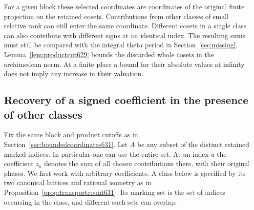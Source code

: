\documentclass[a4paper,11pt]{article}
\theoremstyle{definition}
\theoremstyle{remark}
\numberwithin{equation}{section}
\begin{document}
For a given block these selected coordinates are coordinates of the
original finite projection on the retained cosets. Contributions from
other classes of small relative rank can still enter the same
coordinate. Different cosets in a single class can also contribute
with different signs at an identical index. The resulting sums must
still be compared with the integral theta period in
Section~\ref{sec:missing}. Lemma~\ref{lem:productcut629} bounds the
discarded whole cosets in the archimedean norm. At a finite place a
bound for their absolute values at infinity does not imply any
increase in their valuation.


\subsection{Recovery of a signed coefficient in the presence of other classes}
\label{sec:localrecovery632}

Fix the same block and product cutoffs as in
Section~\ref{sec:boundedcoordinates631}. Let \(A\) be any subset of
the distinct retained marked indices. In particular one can use the
entire set. At an index \(a\) the coefficient \(z_a\) denotes the
sum of all chosen contributions there, with their original phases.
We first work with arbitrary coefficients. A class below is specified
by its two canonical lattices and rational isometry as in
Proposition~\ref{prop:transportcount631}. Its marking set is the
set of indices occurring in the class, and different such sets can
overlap.
\end{document}
